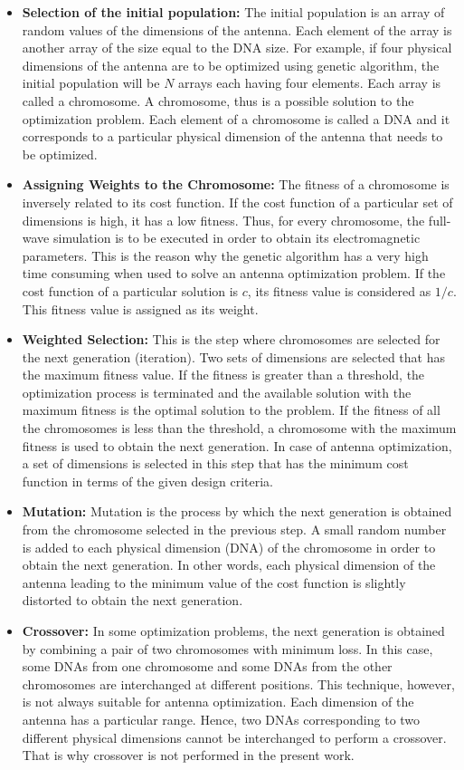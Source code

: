 \begin{itemize}
\item \textbf{Selection of the initial population:} The initial population is an array of random values of the dimensions of the antenna. Each element of the array is another array of the size equal to the DNA size. For example, if four physical dimensions of the antenna are to be optimized using genetic algorithm, the initial population will be $N$ arrays each having four elements. Each array is called a chromosome. A chromosome, thus is a possible solution to the optimization problem. Each element of a chromosome is called a DNA and it corresponds to a particular physical dimension of the antenna that needs to be optimized.
\item \textbf{Assigning Weights to the Chromosome:} The fitness of a chromosome is inversely related to its cost function. If the cost function of a particular set of dimensions is high, it has a low fitness. Thus, for every chromosome, the full-wave simulation is to be executed in order to obtain its electromagnetic parameters. This is the reason why the genetic algorithm has a very high time consuming when used to solve an antenna optimization problem. If the cost function of a particular solution is $c$, its fitness value is considered as $1/c$. This fitness value is assigned as its weight.
\item \textbf{Weighted Selection:} This is the step where chromosomes are selected for the next generation (iteration). Two sets of dimensions are selected that has the maximum fitness value. If the fitness is greater than a threshold, the optimization process is terminated and the available solution with the maximum fitness is the optimal solution to the problem. If the fitness of all the chromosomes is less than the threshold, a chromosome with the maximum fitness is used to obtain the next generation. In case of antenna optimization, a set of dimensions is selected in this step that has the minimum cost function in terms of the given design criteria.
\item \textbf{Mutation:} Mutation is the process by which the next generation is obtained from the chromosome selected in the previous step. A small random number is added to each physical dimension (DNA) of the chromosome in order to obtain the next generation. In other words, each physical dimension of the antenna leading to the minimum value of the cost function is slightly distorted to obtain the next generation.
\item \textbf{Crossover:} In some optimization problems, the next generation is obtained by combining a pair of two chromosomes with minimum loss. In this case, some DNAs from one chromosome and some DNAs from the other chromosomes are interchanged at different positions. This technique, however, is not always suitable for antenna optimization. Each dimension of the antenna has a particular range. Hence, two DNAs corresponding to two different physical dimensions cannot be interchanged to perform a crossover. That is why crossover is not performed in the present work.
\end{itemize}

